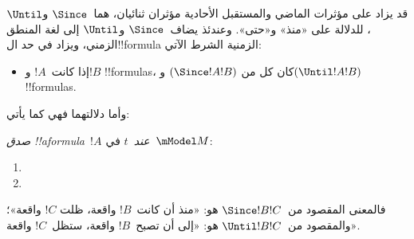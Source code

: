 \documentclass[../../../include/open-logic-section]{subfiles}
\begin{document}


قد يزاد على مؤثرات الماضي والمستقبل الأحادية مؤثران ثنائيان، هما~$\Since$
و$\Until$، للدلالة على «منذ» و«حتى». وعندئذ يضاف~$\Since$ و$\Until$ إلى
لغة المنطق الزمني، ويزاد في حد ال!!{formula} الزمنية الشرط الآتي:

\begin{itemize}
\item[] إذا كانت~$!A$ و$!B$ !!{formula}s، كان كل من
  $(\Since !A !B)$ و$(\Until !A !B)$ !!{formula}s.
\end{itemize}

وأما دلالتهما فهي كما يأتي:

\begin{defn}
  \emph{صدق !!a{formula}~$!A$ عند~$t$} في~$\mModel M$:
  \begin{enumerate}
  \item{} 
  \item{} 
  \end{enumerate}
\end{defn}

فالمعنى المقصود من~$\Since !B !C$ هو: «منذ أن كانت~$!B$ واقعة، ظلت
$!C$ واقعة»؛ والمقصود من~$\Until !B !C$ هو: «إلى أن تصبح~$!B$ واقعة،
ستظل~$!C$ واقعة».
\end{document}
